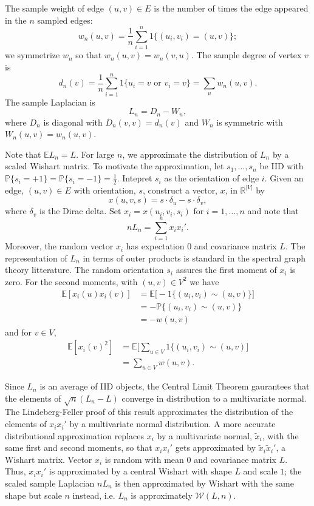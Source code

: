 \documentclass{article}
\newcommand{\reals}{\mathbb{R}}
\newcommand{\prob}{\mathbb{P}}
\newcommand{\E}{\mathbb{E}}
\begin{document}
The sample weight of edge $(u,v) \in E$ is the number of times the edge
appeared in the $n$ sampled edges:
\[
  w_n(u,v) = \frac{1}{n} \sum_{i=1}^n 1\{ (u_i,v_i) = (u,v) \};
\]
we symmetrize $w_n$ so that $w_n(u,v) = w_n(v,u)$.
The sample degree of vertex $v$ is
\[
  d_n(v) = \frac{1}{n} \sum_{i = 1}^{n} 1\{ u_i = v \text{ or } v_i = v\} = \sum_u w_n(u,v).
\]
The sample Laplacian is
\[
  L_n = D_n - W_n,
\]
where $D_n$ is diagonal with $D_n(v,v) = d_n(v)$ and $W_n$ is
symmetric with $W_n(u,v) = w_n(u,v)$.

Note that $\E L_n = L$.  For large $n$, we approximate the
distribution of $L_n$ by a scaled Wishart
matrix.  To motivate the approximation, let $s_1, \ldots, s_n$ be IID
with $\prob\{ s_i = +1 \} = \prob\{ s_i = -1 \} = \tfrac{1}{2}$.
Intepret $s_i$ as the orientation of edge $i$.  Given an edge,
$(u,v) \in E$ with orientation, $s$, construct a vector, $x$, in $\reals^|V|$ by
\[
  x(u,v,s) = s \cdot \delta_u - s \cdot \delta_v,
\]
where $\delta_v$ is the Dirac delta.
Set $x_i = x(u_i, v_i, s_i)$ for $i = 1, \ldots, n$ and note that
\[
  n L_n = \sum_{i=1}^{n} x_i x_i'.
\]
Moreover, the random vector $x_i$ has expectation $0$ and covariance
matrix $L$.  The representation of $L_n$ in terms of
outer products is standard in the spectral graph theory litterature.
The random orientation $s_i$ assures the first moment of $x_i$ is
zero. For the second moments, with $(u,v) \in V^2$ we have
\begin{align*}
  \E[x_i(u) x_i(v)]
    &= \E\big[ - 1\big\{ (u_i, v_i)  \sim (u,v) \big\}\big] \\
    &= - \prob\big\{ (u_i,v_i) \sim (u,v) \big\} \\
    &= -w(u,v)
\end{align*}
and for $v \in V$,
\begin{align*}
  \E[x_i(v)^2]
    &= \E\Big[ \sum_{u \in V} 1\big\{(u_i,v_i) \sim (u,v) \Big] \\
    &= \sum_{u \in V} w(u,v).
\end{align*}

Since $L_n$ is an average of IID objects, the Central Limit Theorem gaurantees
that the elements of $\sqrt{n} (L_n - L)$ converge in distribution to a multivariate
normal.  The Lindeberg-Feller proof of this result approximates the
distribution of the elements of $x_i x_i'$ by a multivariate normal
distribution.  A more accurate distributional approximation replaces $x_i$ by a
multivariate normal, $\tilde x_i$, with the same first and second
moments, so that $x_i x_i'$ gets approximated by $\tilde x_i \tilde
x_i'$, a Wishart matrix.
 Vector $x_i$ is random with mean $0$ and covariance matrix
$L$.  Thus, $x_i x_i'$ is approximated by a central
Wishart with shape $L$ and scale $1$; the scaled sample
Laplacian $n L_n$ is then approximated by Wishart with the same shape
but scale $n$ instead, i.e. $L_n$ is approximately $\mathcal{W}(L, n)$.
\end{document}
